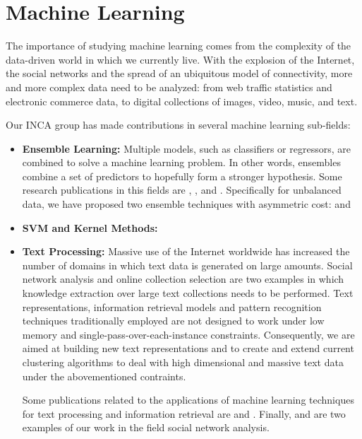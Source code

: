 \section{Machine Learning}

The importance of studying machine learning comes from the complexity of
the data-driven world in which we currently live. With the explosion of
the Internet, the social networks and the spread of an ubiquitous model of
connectivity, more and more complex data need to be analyzed: from web
traffic statistics and electronic commerce data, to digital collections of
images, video, music, and text.

Our INCA group has made contributions in several machine learning
sub-fields:
\begin{itemize}
\item \textbf{Ensemble Learning:} Multiple models, such as classifiers or
regressors, are combined to solve a machine learning problem. In other
words, ensembles combine a set of predictors to hopefully form a stronger
hypothesis.
Some research publications in this fields are \cite{NanculefVAM06},
\cite{ValleSAMF10}, \cite{FernandezVSA12} and \cite{NanculefVAM12}.
Specifically for unbalanced data, we have proposed two ensemble techniques with
asymmetric cost: \cite{NanculefVAM07} and \cite{OrmenoRVAA12}
\item \textbf{SVM and Kernel Methods:}
\item \textbf{Text Processing:} Massive use of the Internet worldwide has
increased the number of domains in which text data is generated on large
amounts. Social network analysis and online collection selection are two
examples in which knowledge extraction over large text collections needs
to be performed. Text representations, information retrieval models and
pattern recognition techniques traditionally employed are not designed to
work under low memory and single-pass-over-each-instance constraints.
Consequently, we are aimed at building new text representations and to
create and extend current clustering algorithms to deal with high
dimensional and massive text data under the abovementioned contraints.

Some publications related to the applications of machine learning
techniques for text processing and information retrieval are \cite{ZMA14}
and \cite{MZ09}. Finally, \cite{ZGDAVS13} and \cite{CSHZ12} are two
examples of our work in the field social network analysis.


\end{itemize}
